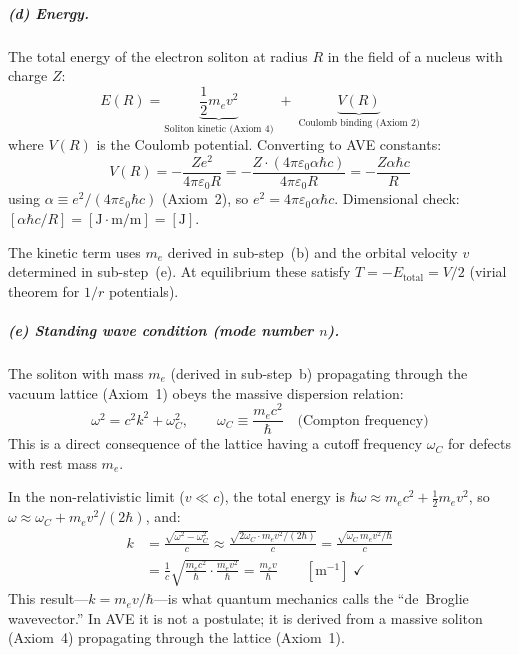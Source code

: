 \subparagraph{(d) Energy.}
The total energy of the electron soliton at radius $R$ in the
field of a nucleus with charge $Z$:
\begin{equation}
    E(R) = \underbrace{\frac{1}{2}m_e v^2}_{
    \text{Soliton kinetic (Axiom~4)}}
    \;+\;\underbrace{V(R)}_{
    \text{Coulomb binding (Axiom~2)}}
    \label{eq:E_single}
\end{equation}
where $V(R)$ is the Coulomb potential.  Converting to
AVE constants:
\begin{equation}
    V(R) = -\frac{Ze^2}{4\pi\varepsilon_0 R}
    = -\frac{Z \cdot (4\pi\varepsilon_0 \alpha \hbar c)}
    {4\pi\varepsilon_0 R}
    = -\frac{Z\alpha\hbar c}{R}
    \label{eq:V_coulomb}
\end{equation}
using $\alpha \equiv e^2/(4\pi\varepsilon_0\hbar c)$
(Axiom~2), so $e^2 = 4\pi\varepsilon_0 \alpha\hbar c$.
Dimensional check: $[\alpha\hbar c / R]
= [\text{J}\cdot\text{m}/\text{m}] = [\text{J}]$.
\checkmark

The kinetic term uses $m_e$ derived in sub-step~(b)
and the orbital velocity $v$ determined in sub-step~(e).
At equilibrium these satisfy $T = -E_{\text{total}} = V/2$
(virial theorem for $1/r$ potentials).

\subparagraph{(e) Standing wave condition (mode number $n$).}

The soliton with mass $m_e$ (derived in sub-step~b)
propagating through the vacuum lattice (Axiom~1)
obeys the massive dispersion relation:
\begin{equation}
    \omega^2 = c^2 k^2 + \omega_C^2, \qquad
    \omega_C \equiv \frac{m_e c^2}{\hbar}
    \quad\text{(Compton frequency)}
    \label{eq:soliton_dispersion}
\end{equation}
This is a direct consequence of the lattice having a
cutoff frequency $\omega_C$ for defects with rest mass $m_e$.

In the non-relativistic limit ($v \ll c$), the total
energy is $\hbar\omega \approx m_e c^2 + \tfrac{1}{2}m_e v^2$,
so $\omega \approx \omega_C + m_e v^2/(2\hbar)$, and:
\begin{align}
    k &= \frac{\sqrt{\omega^2 - \omega_C^2}}{c}
    \approx \frac{\sqrt{2\omega_C \cdot m_e v^2/(2\hbar)}}{c}
    = \frac{\sqrt{\omega_C\, m_e v^2 / \hbar}}{c}
    \nonumber \\
    &= \frac{1}{c}
    \sqrt{\frac{m_e c^2}{\hbar} \cdot \frac{m_e v^2}{\hbar}}
    = \frac{m_e v}{\hbar}
    \qquad [\text{m}^{-1}]\;\checkmark
    \label{eq:k_soliton}
\end{align}
This result---$k = m_e v / \hbar$---is what quantum mechanics
calls the ``de~Broglie wavevector.''  In AVE it is not
a postulate; it is derived from a massive soliton
(Axiom~4) propagating through the lattice (Axiom~1).

